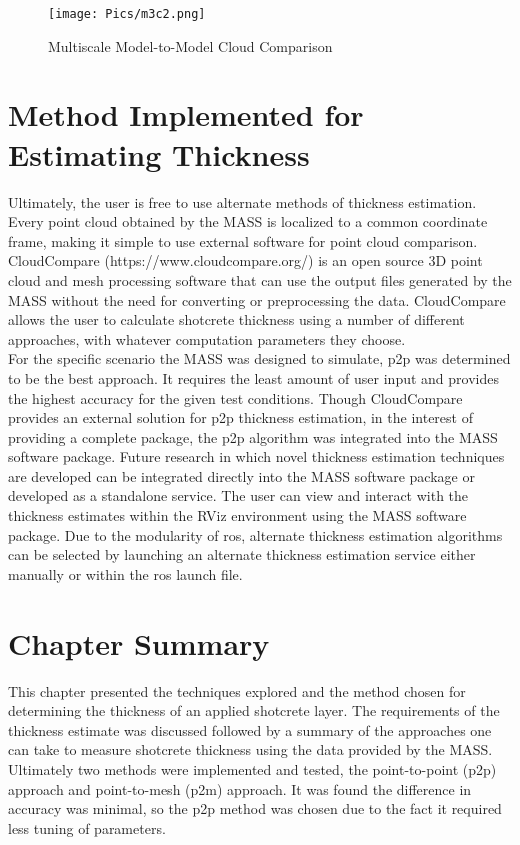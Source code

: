 \begin{figure}[h!]
    \centering
    \texttt{[image: Pics/m3c2.png]}
    \caption{Multiscale Model-to-Model Cloud Comparison \cite{thick1}}
    \label{fig:m3c2}
\end{figure}
\section{Method Implemented for Estimating Thickness}
Ultimately, the user is free to use alternate methods of thickness estimation. Every point cloud obtained by the MASS is localized to a common coordinate frame, making it simple to use external software for point cloud comparison. CloudCompare (https://www.cloudcompare.org/) is an open source 3D point cloud and mesh processing software that can use the output files generated by the MASS without the need for converting or preprocessing the data. CloudCompare allows the user to calculate shotcrete thickness using a number of different approaches, with whatever computation parameters they choose.\\

For the specific scenario the MASS was designed to simulate, \acrshort{p2p} was determined to be the best approach. It requires the least amount of user input and provides the highest accuracy for the given test conditions. Though CloudCompare provides an external solution for \acrshort{p2p} thickness estimation, in the interest of providing a complete package, the \acrshort{p2p} algorithm was integrated into the MASS software package. Future research in which novel thickness estimation techniques are developed can be integrated directly into the MASS software package or developed as a standalone service. The user can view and interact with the thickness estimates within the RViz environment using the MASS software package. Due to the modularity of \acrshort{ros}, alternate thickness estimation algorithms can be selected by launching an alternate thickness estimation service either manually or within the \acrshort{ros} launch file.\\
\section{Chapter Summary}
This chapter presented the techniques explored and the method chosen for determining the thickness of an applied shotcrete layer. The requirements of the thickness estimate was discussed followed by a summary of the approaches one can take to measure shotcrete thickness using the data provided by the MASS. Ultimately two methods were implemented and tested, the point-to-point (\acrshort{p2p}) approach and point-to-mesh (\acrshort{p2m}) approach. It was found the difference in accuracy was minimal, so the \acrshort{p2p} method was chosen due to the fact it required less tuning of parameters.\\